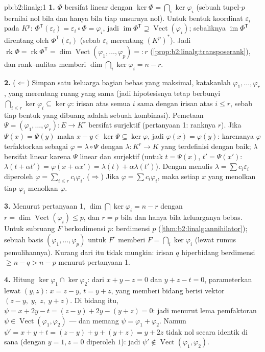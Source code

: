 \begin{solution}{pb:b2:linalg:1}
\textbf{1.} $\Phi$ bersifat linear dengan $\ker\Phi = \bigcap_i
\ker\varphi_i$ (sebuah tupel-$p$ bernilai nol bila dan hanya bila tiap
unsurnya nol). Untuk bentuk koordinat $\varepsilon_i$ pada $K^p$:
$\Phi^{\mathsf T}(\varepsilon_i) = \varepsilon_i \circ \Phi = \varphi_i$,
jadi $\operatorname{im}\Phi^{\mathsf T} \supseteq
\operatorname{Vect}(\varphi_i)$; sebaliknya
$\operatorname{im}\Phi^{\mathsf T}$ direntang oleh
$\Phi^{\mathsf T}(\varepsilon_i)$ (sebab $\varepsilon_i$ merentang
$(K^p)^*$). Jadi $\operatorname{rk}\Phi = \operatorname{rk}
\Phi^{\mathsf T} = \dim\operatorname{Vect}(\varphi_1, \dots,
\varphi_p) =: r$ (\cref{prop:b2:linalg:transposerank}), dan
rank--nulitas memberi $\dim\bigcap_i\ker\varphi_i = n - r$.

\textbf{2.} ($\Leftarrow$) Simpan satu keluarga bagian bebas yang
maksimal, katakanlah $\varphi_1, \dots, \varphi_r$, yang merentang ruang
yang sama (jadi hipotesisnya tetap berbunyi $\bigcap_{i \leq
r}\ker\varphi_i \subseteq \ker\varphi$: irisan atas semua $i$ sama dengan
irisan atas $i \leq r$, sebab tiap bentuk yang dibuang adalah sebuah
kombinasi). Pemetaan $\Psi = (\varphi_1, \dots, \varphi_r) \colon E \to
K^r$ bersifat surjektif (pertanyaan 1: ranknya $r$). Jika $\Psi(x) =
\Psi(y)$ maka $x - y \in \ker\Psi \subseteq \ker\varphi$, jadi
$\varphi(x) = \varphi(y)$: karenanya $\varphi$ terfaktorkan sebagai
$\varphi = \lambda \circ \Psi$ dengan $\lambda \colon K^r \to K$ yang
terdefinisi dengan baik; $\lambda$ bersifat linear karena $\Psi$ linear
dan surjektif (untuk $t = \Psi(x)$, $t' = \Psi(x')$: $\lambda(t + \alpha
t') = \varphi(x + \alpha x') = \lambda(t) + \alpha\lambda(t')$). Dengan
menulis $\lambda = \sum c_i \varepsilon_i$ diperoleh $\varphi = \sum_{i
\leq r} c_i\varphi_i$. ($\Rightarrow$) Jika $\varphi = \sum c_i
\varphi_i$, maka setiap $x$ yang menolkan tiap $\varphi_i$ menolkan $\varphi$.

\textbf{3.} Menurut pertanyaan 1, $\dim\bigcap\ker\varphi_i = n - r$
dengan $r = \dim\operatorname{Vect}(\varphi_i) \leq p$, dan $r = p$
bila dan hanya bila keluarganya bebas. Untuk subruang $F$ berkodimensi
$p$:  berdimensi $p$
(\cref{thm:b2:linalg:annihilator}); sebuah basis $(\varphi_1, \dots,
\varphi_p)$ untuk $F^\circ$ memberi $F = \bigcap_i\ker\varphi_i$ (lewat
rumus pemulihannya). Kurang dari itu tidak mungkin: irisan $q$
hiperbidang berdimensi $\geq n - q > n - p$ menurut pertanyaan 1.

\textbf{4.} Hitung $\ker\varphi_1 \cap \ker\varphi_2$: dari $x
+ y - z = 0$ dan $y + z - t = 0$, parameterkan lewat $(y, z)$: $x = z
- y$, $t = y + z$, yang memberi bidang berisi vektor $(z - y,\; y,\;
z,\; y + z)$. Di bidang itu, $\psi = x + 2y - t = (z - y) + 2y - (y + z)
= 0$: jadi menurut lema pemfaktoran $\psi \in
\operatorname{Vect}(\varphi_1, \varphi_2)$ --- dan memang $\psi =
\varphi_1 + \varphi_2$. Namun $\psi' = x + y + t = (z - y) + y +
(y + z) = y + 2z$ tidak nol secara identik di sana (dengan $y = 1, z = 0$
diperoleh $1$): jadi $\psi' \notin \operatorname{Vect}(\varphi_1,
\varphi_2)$.


\end{solution}
